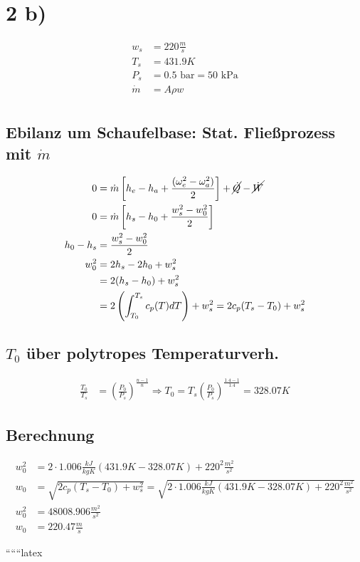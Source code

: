 \section*{2 b)}

\begin{align*}
w_s &= 220 \frac{m}{s} \\
T_s &= 431.9 K \\
P_s &= 0.5 \text{ bar} = 50 \text{ kPa} \\
\dot{m} &= A \rho w \\
\end{align*}


\subsection*{Ebilanz um Schaufelbase: Stat. Fließprozess mit $\dot{m}$}

\begin{align*}
0 &= \dot{m} \left[ h_e - h_a + \frac{(\omega_e^2 - \omega_a^2)}{2} \right] + \cancel{\dot{Q}} - \cancel{\dot{W}} \\
0 &= \dot{m} \left[ h_s - h_0 + \frac{w_s^2 - w_0^2}{2} \right] \\
h_0 - h_s &= \frac{w_s^2 - w_0^2}{2} \\
w_0^2 &= 2 h_s - 2 h_0 + w_s^2 \\
&= 2 (h_s - h_0) + w_s^2 \\
&= 2 \left( \int_{T_0}^{T_s} c_p(T) dT \right) + w_s^2 = 2 c_p (T_s - T_0) + w_s^2
\end{align*}

\subsection*{$T_0$ über polytropes Temperaturverh.}

\begin{align*}
\frac{T_0}{T_s} &= \left( \frac{P_0}{P_s} \right)^{\frac{n-1}{n}} \Rightarrow T_0 = T_s \left( \frac{P_0}{P_s} \right)^{\frac{1.4 - 1}{1.4}} = 328.07 K
\end{align*}

\subsection*{Berechnung}

\begin{align*}
w_0^2 &= 2 \cdot 1.006 \frac{kJ}{kgK} (431.9 K - 328.07 K) + 220^2 \frac{m^2}{s^2} \\
w_0 &= \sqrt{2 c_p (T_s - T_0) + w_s^2} = \sqrt{2 \cdot 1.006 \frac{kJ}{kgK} (431.9 K - 328.07 K) + 220^2 \frac{m^2}{s^2}} \\
w_0^2 &= 48008.906 \frac{m^2}{s^2} \\
w_0 &= 220.47 \frac{m}{s}
\end{align*}

``````latex
